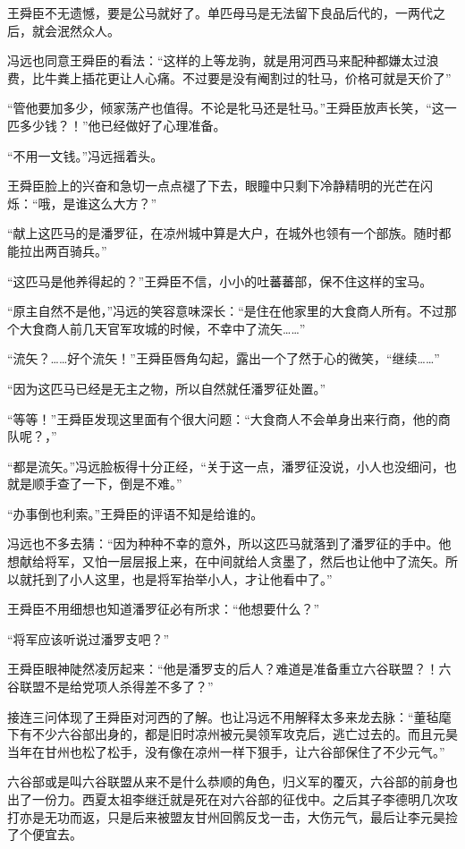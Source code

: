 王舜臣不无遗憾，要是公马就好了。单匹母马是无法留下良品后代的，一两代之后，就会泯然众人。

冯远也同意王舜臣的看法：“这样的上等龙驹，就是用河西马来配种都嫌太过浪费，比牛粪上插花更让人心痛。不过要是没有阉割过的牡马，价格可就是天价了”

“管他要加多少，倾家荡产也值得。不论是牝马还是牡马。”王舜臣放声长笑，“这一匹多少钱？！”他已经做好了心理准备。

“不用一文钱。”冯远摇着头。

王舜臣脸上的兴奋和急切一点点褪了下去，眼瞳中只剩下冷静精明的光芒在闪烁：“哦，是谁这么大方？”

“献上这匹马的是潘罗征，在凉州城中算是大户，在城外也领有一个部族。随时都能拉出两百骑兵。”

“这匹马是他养得起的？”王舜臣不信，小小的吐蕃蕃部，保不住这样的宝马。

“原主自然不是他，”冯远的笑容意味深长：“是住在他家里的大食商人所有。不过那个大食商人前几天官军攻城的时候，不幸中了流矢……”

“流矢？……好个流矢！”王舜臣唇角勾起，露出一个了然于心的微笑，“继续……”

“因为这匹马已经是无主之物，所以自然就任潘罗征处置。”

“等等！”王舜臣发现这里面有个很大问题：“大食商人不会单身出来行商，他的商队呢？，”

“都是流矢。”冯远脸板得十分正经，“关于这一点，潘罗征没说，小人也没细问，也就是顺手查了一下，倒是不难。”

“办事倒也利索。”王舜臣的评语不知是给谁的。

冯远也不多去猜：“因为种种不幸的意外，所以这匹马就落到了潘罗征的手中。他想献给将军，又怕一层层报上来，在中间就给人贪墨了，然后也让他中了流矢。所以就托到了小人这里，也是将军抬举小人，才让他看中了。”

王舜臣不用细想也知道潘罗征必有所求：“他想要什么？”

“将军应该听说过潘罗支吧？”

王舜臣眼神陡然凌厉起来：“他是潘罗支的后人？难道是准备重立六谷联盟？！六谷联盟不是给党项人杀得差不多了？”

接连三问体现了王舜臣对河西的了解。也让冯远不用解释太多来龙去脉：“董毡麾下有不少六谷部出身的，都是旧时凉州被元昊领军攻克后，逃亡过去的。而且元昊当年在甘州也松了松手，没有像在凉州一样下狠手，让六谷部保住了不少元气。”

六谷部或是叫六谷联盟从来不是什么恭顺的角色，归义军的覆灭，六谷部的前身也出了一份力。西夏太祖李继迁就是死在对六谷部的征伐中。之后其子李德明几次攻打亦是无功而返，只是后来被盟友甘州回鹘反戈一击，大伤元气，最后让李元昊捡了个便宜去。

